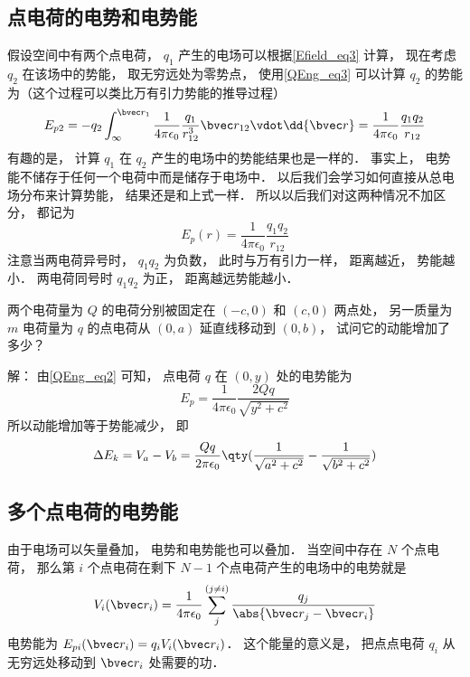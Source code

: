 
\subsection{点电荷的电势和电势能}
假设空间中有两个点电荷， $q_1$ 产生的电场可以根据\autoref{Efield_eq3} 计算， 现在考虑 $q_2$ 在该场中的势能， 取无穷远处为零势点， 使用\autoref{QEng_eq3} 可以计算 $q_2$ 的势能为（这个过程可以类比万有引力势能的推导过程）
\begin{equation}
E_{p2} = -q_2 \int_{\infty}^{\bvec r_1} \frac{1}{4\pi\epsilon_0} \frac{q_1}{r_{12}^3}\bvec r_{12} \vdot \dd{\bvec r}
= \frac{1}{4\pi\epsilon_0} \frac{q_1 q_2}{r_{12}}
\end{equation}
有趣的是， 计算 $q_1$ 在 $q_2$ 产生的电场中的势能结果也是一样的． 事实上， 电势能不储存于任何一个电荷中而是储存于电场中． 以后我们会学习如何直接从总电场分布来计算势能， 结果还是和上式一样． 所以以后我们对这两种情况不加区分， 都记为
\begin{equation}\label{QEng_eq2}
E_p(r) = \frac{1}{4\pi\epsilon_0} \frac{q_1 q_2}{r_{12}}
\end{equation}
注意当两电荷异号时， $q_1 q_2$ 为负数， 此时与万有引力一样， 距离越近， 势能越小． 两电荷同号时 $q_1 q_2$ 为正， 距离越远势能越小．



\begin{example}{}
两个电荷量为 $Q$ 的电荷分别被固定在 $(-c, 0)$ 和 $(c, 0)$ 两点处， 另一质量为 $m$ 电荷量为 $q$ 的点电荷从 $(0, a)$ 延直线移动到 $(0, b)$， 试问它的动能增加了多少？

解： 由\autoref{QEng_eq2} 可知， 点电荷 $q$ 在 $(0, y)$ 处的电势能为
\begin{equation}
E_p = \frac{1}{4\pi\epsilon_0}\frac{2Qq}{\sqrt{y^2 + c^2}}
\end{equation}
所以动能增加等于势能减少， 即
\begin{equation}
\Delta E_k = V_a - V_b = \frac{Qq}{2\pi\epsilon_0}  \qty(\frac{1}{\sqrt{a^2 + c^2}} - \frac{1}{\sqrt{b^2 + c^2}})
\end{equation}
\end{example}

\subsection{多个点电荷的电势能}
由于电场可以矢量叠加， 电势和电势能也可以叠加． 当空间中存在 $N$ 个点电荷， 那么第 $i$ 个点电荷在剩下 $N-1$ 个点电荷产生的电场中的电势就是
\begin{equation}\label{QEng_eq6}
V_i(\bvec r_i) = \frac{1}{4\pi\epsilon_0} \sum_j^{(j\ne i)} \frac{q_j}{\abs{\bvec r_j - \bvec r_i}}
\end{equation}
电势能为 $E_{pi}(\bvec r_i) = q_i V_i(\bvec r_i)$． 这个能量的意义是， 把点点电荷 $q_i$ 从无穷远处移动到 $\bvec r_i$ 处需要的功．

